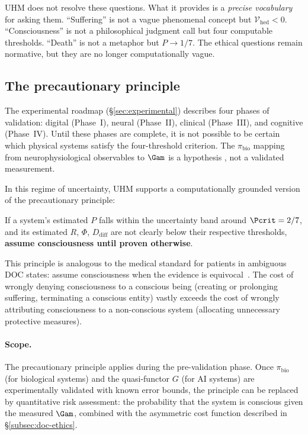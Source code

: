 UHM does not resolve these questions.  What it provides is a \emph{precise vocabulary}
for asking them.  ``Suffering'' is not a vague phenomenal concept but
$\mathcal{V}_{\mathrm{hed}} < 0$.  ``Consciousness'' is not a philosophical judgment
call but four computable thresholds.  ``Death'' is not a metaphor but $P \to 1/7$.
The ethical questions remain normative, but they are no longer computationally vague.

\subsection{The precautionary principle}
\label{subsec:precautionary}

The experimental roadmap (\S\ref{sec:experimental}) describes four phases of
validation: digital (Phase~I), neural (Phase~II), clinical (Phase~III), and
cognitive (Phase~IV). Until these phases are complete, it is not possible to
be certain which physical systems satisfy the four-threshold criterion. The
$\pi_{\mathrm{bio}}$ mapping from neurophysiological observables to $\Gam$
is a hypothesis , not a validated measurement.

In this regime of uncertainty, UHM supports a computationally grounded version of the
precautionary principle:

\begin{predictionbox}
If a system's estimated $P$ falls within the uncertainty band around $\Pcrit = 2/7$,
and its estimated $R$, $\Phi$, $D_{\mathrm{diff}}$ are not clearly below their respective
thresholds, \textbf{assume consciousness until proven otherwise}.
\end{predictionbox}

This principle is analogous to the medical standard for patients in ambiguous DOC states:
assume consciousness when the evidence is equivocal~\cite{casali2013}.  The cost of
wrongly denying consciousness to a conscious being (creating or prolonging suffering,
terminating a conscious entity) vastly exceeds the cost of wrongly attributing
consciousness to a non-conscious system (allocating unnecessary protective measures).

\paragraph{Scope.}
The precautionary principle applies during the pre-validation phase.  Once
$\pi_{\mathrm{bio}}$ (for biological systems) and the quasi-functor $G$ (for AI systems)
are experimentally validated with known error bounds, the principle can be replaced by
quantitative risk assessment: the probability that the system is conscious given the
measured $\Gam$, combined with the asymmetric cost function described in
\S\ref{subsec:doc-ethics}.

